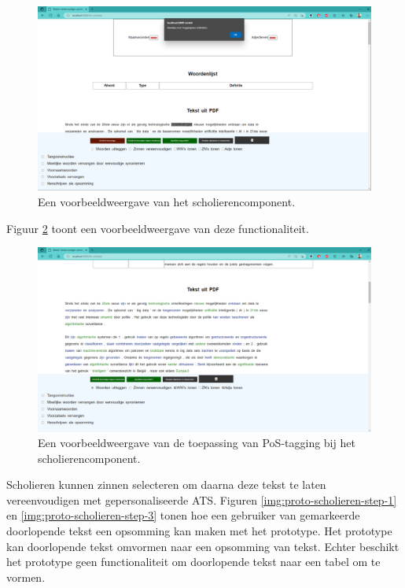 \begin{center}
	\begin{figure}[H]
		\includegraphics[width=\linewidth]{img/proto-melding.png}
		\caption{Een voorbeeldweergave van het scholierencomponent.}
		\label{img:proto-homescreen-scholieren}
	\end{figure}
\end{center}

Figuur \ref{img:proto-pos-tagging-scholieren} toont een voorbeeldweergave van deze functionaliteit. 

\begin{center}
	\begin{figure}[H]
		\includegraphics[width=\linewidth]{img/proto-pos-tagging.png}
		\caption{Een voorbeeldweergave van de toepassing van PoS-tagging bij het scholierencomponent.}
		\label{img:proto-pos-tagging-scholieren}
	\end{figure}
\end{center}

Scholieren kunnen zinnen selecteren om daarna deze tekst te laten vereenvoudigen met gepersonaliseerde ATS. Figuren \ref{img:proto-scholieren-step-1} en \ref{img:proto-scholieren-step-3} tonen hoe een gebruiker van gemarkeerde doorlopende tekst een opsomming kan maken met het prototype. Het prototype kan doorlopende tekst omvormen naar een opsomming van tekst. Echter beschikt het prototype geen functionaliteit om doorlopende tekst naar een tabel om te vormen.

